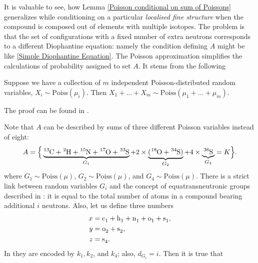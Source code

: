 It is valuable to see, how Lemma \ref{Poisson conditional on sum of Poissons} generalizes while conditioning on a particular {\it localised fine structure} when the compound is composed out of elements with multiple isotopes. The problem is that the set of configurations with a fixed number of extra neutrons corresponds to a different Diophantine equation: namely the condition defining $A$ might be like \eqref{Simple Diophantine Equation}. The Poisson approximation simplifies the calculations of probability assigned to set $A$. It stems from the following


\begin{lemma}\label{sum of independent Poissons lemma}
	Suppose we have a collection of $m$ independent Poisson-distributed random variables, $X_i \sim \mathrm{Poiss}(\mu_i)$. Then $X_1 + \dots + X_m \sim \mathrm{Poiss}(\mu_1 + \dots + \mu_m)$. 
\end{lemma}  
The proof can be found in \cite{Kingman1993PoissonProcesses}. 


Note that $A$ can be described by sums of three different Poisson variables instead of eight:
\begin{equation}\label{setA}
	A = \Big\{ \underbrace{\cem{^{13}C} + \cem{^2H} + \cem{^{15}N} + \cem{^{17}O} + \cem{^{33}S}}_{ G_1 } + 2 \times \underbrace{( \cem{^{18}O} + \cem{^{34}S} )}_{ G_2 } + 4 \times \underbrace{\cem{^{36}S}}_{ G_4 } = K \Big\}.	
\end{equation}
where $G_1 \sim \mathrm{Poiss}(\mu)$, $G_2 \sim \mathrm{Poiss}(\mu)$, and $G_4 \sim \mathrm{Poiss}(\mu)$. There is a strict link between random variables $G_i$ and the concept of equatransneutronic groups described in \cite{Olson2009Calculations}: it is equal to the total number of atoms in a compound bearing additional $i$ neutrons. Also, let us define three numbers
\begin{align*}
	x 	& = \cem{c_1} + \cem{h_1} + \cem{n_1} + \cem{o_1} + \cem{s_1}, \\	  	
	y 	& = \cem{o_2} + \cem{s_2}, 	\\
	z 	& = \cem{s_4}.
\end{align*}
In \cite{Olson2009Calculations} they are encoded by $k_1, k_2$, and $k_4$; also, $d_{G_i} = i$. Then it is true that

